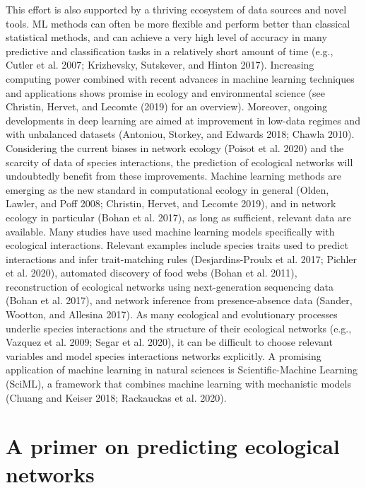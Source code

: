 \documentclass[11pt]{article}
\begin{document}
This effort is also supported by a thriving ecosystem of data sources
and novel tools. ML methods can often be more flexible and perform
better than classical statistical methods, and can achieve a very high
level of accuracy in many predictive and classification tasks in a
relatively short amount of time (e.g., Cutler et al. 2007; Krizhevsky,
Sutskever, and Hinton 2017). Increasing computing power combined with
recent advances in machine learning techniques and applications shows
promise in ecology and environmental science (see Christin, Hervet, and
Lecomte (2019) for an overview). Moreover, ongoing developments in deep
learning are aimed at improvement in low-data regimes and with
unbalanced datasets (Antoniou, Storkey, and Edwards 2018; Chawla 2010).
Considering the current biases in network ecology (Poisot et al. 2020)
and the scarcity of data of species interactions, the prediction of
ecological networks will undoubtedly benefit from these improvements.
Machine learning methods are emerging as the new standard in
computational ecology in general (Olden, Lawler, and Poff 2008;
Christin, Hervet, and Lecomte 2019), and in network ecology in
particular (Bohan et al. 2017), as long as sufficient, relevant data are
available. Many studies have used machine learning models specifically
with ecological interactions. Relevant examples include species traits
used to predict interactions and infer trait-matching rules
(Desjardins-Proulx et al. 2017; Pichler et al. 2020), automated
discovery of food webs (Bohan et al. 2011), reconstruction of ecological
networks using next-generation sequencing data (Bohan et al. 2017), and
network inference from presence-absence data (Sander, Wootton, and
Allesina 2017). As many ecological and evolutionary processes underlie
species interactions and the structure of their ecological networks
(e.g., Vazquez et al. 2009; Segar et al. 2020), it can be difficult to
choose relevant variables and model species interactions networks
explicitly. A promising application of machine learning in natural
sciences is Scientific-Machine Learning (SciML), a framework that
combines machine learning with mechanistic models (Chuang and Keiser
2018; Rackauckas et al. 2020).

\hypertarget{a-primer-on-predicting-ecological-networks}{%
\section{A primer on predicting ecological
networks}\label{a-primer-on-predicting-ecological-networks}}
\end{document}

